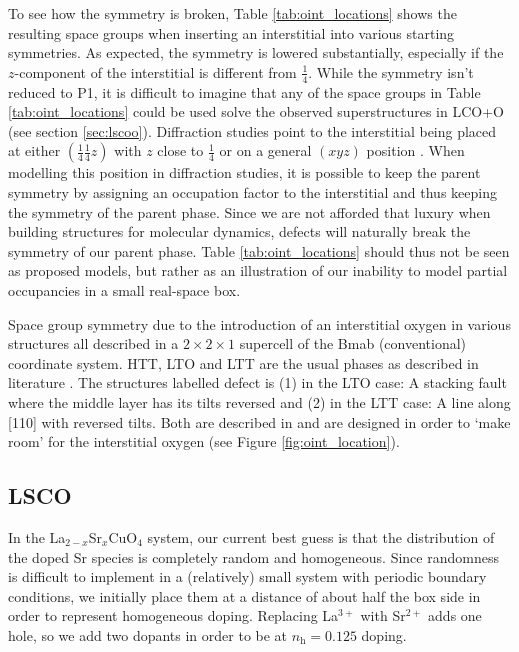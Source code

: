 To see how the symmetry is broken, Table \ref{tab:oint_locations} shows the resulting space groups when inserting an interstitial into various starting symmetries. As expected, the symmetry is lowered substantially, especially if the $z$-component of the interstitial is different from $\frac{1}{4}$. While the symmetry isn't reduced to P1, it is difficult to imagine that any of the space groups in Table \ref{tab:oint_locations} could be used solve the observed superstructures in LCO+O (see section \ref{sec:lscoo}). Diffraction studies point to the interstitial being placed at either $\left(\frac{1}{4} \frac{1}{4} z \right)$ with $z$ close to $\frac{1}{4}$ or on a general $(xyz)$ position \cite{Rial1997}. When modelling this position in diffraction studies, it is possible to keep the parent symmetry by assigning an occupation factor to the interstitial and thus keeping the symmetry of the parent phase. Since we are not afforded that luxury when building structures for molecular dynamics, defects will naturally break the symmetry of our parent phase. Table \ref{tab:oint_locations} should thus not be seen as proposed models, but rather as an illustration of our inability to model partial occupancies in a small real-space box.

\begin{table}
	\centering
	\caption[Oxygen interstitial phases]{Space group symmetry due to the introduction of an interstitial oxygen in various structures all described in a $2 \times 2 \times 1$ supercell of the Bmab (conventional) coordinate system. HTT, LTO and LTT are the usual phases as described in literature \cite{Hucker2012}. The structures labelled defect is (1) in the LTO case: A stacking fault where the middle layer has its tilts reversed and (2) in the LTT case: A line along [110] with reversed tilts. Both are described in \cite{Tranquada1994} and are designed in order to `make room' for the interstitial oxygen (see Figure \ref{fig:oint_location}).}
    \label{tab:oint_locations}
    
\end{table}

\subsection{LSCO}
In the La$_{2-x}$Sr$_x$CuO$_4$ system, our current best guess is that the distribution of the doped Sr species is completely random and homogeneous. Since randomness is difficult to implement in a (relatively) small system with periodic boundary conditions, we initially place them at a distance of about half the box side in order to  represent homogeneous doping. Replacing La$^{3+}$ with Sr$^{2+}$ adds one hole, so we add two dopants in order to be at $n_\text{h} = 0.125$ doping.

